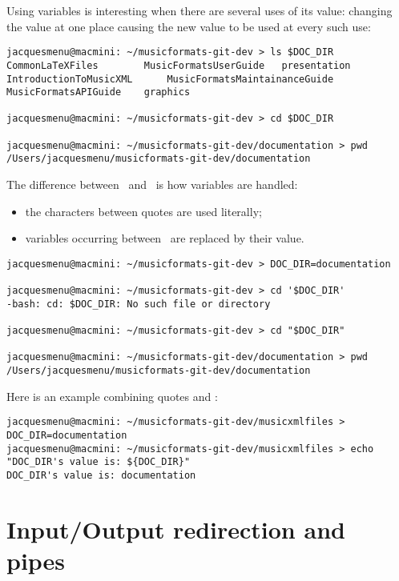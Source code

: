 Using variables is interesting when there are several uses of its value: changing the value at one place causing the new value to be used at every such use:
\begin{lstlisting}[language=Terminal]
jacquesmenu@macmini: ~/musicformats-git-dev > ls $DOC_DIR
CommonLaTeXFiles		MusicFormatsUserGuide	presentation
IntroductionToMusicXML		MusicFormatsMaintainanceGuide
MusicFormatsAPIGuide	graphics

jacquesmenu@macmini: ~/musicformats-git-dev > cd $DOC_DIR

jacquesmenu@macmini: ~/musicformats-git-dev/documentation > pwd
/Users/jacquesmenu/musicformats-git-dev/documentation
\end{lstlisting}

The difference between \quotes\ and \doubleQuotes\ is how variables are handled:
\begin{itemize}
\item the characters between quotes are used literally;
\item variables occurring between \doubleQuotes\ are replaced by their value.
\end{itemize}

\begin{lstlisting}[language=Terminal]
jacquesmenu@macmini: ~/musicformats-git-dev > DOC_DIR=documentation

jacquesmenu@macmini: ~/musicformats-git-dev > cd '$DOC_DIR'
-bash: cd: $DOC_DIR: No such file or directory

jacquesmenu@macmini: ~/musicformats-git-dev > cd "$DOC_DIR"

jacquesmenu@macmini: ~/musicformats-git-dev/documentation > pwd
/Users/jacquesmenu/musicformats-git-dev/documentation
\end{lstlisting}

Here is an example combining quotes and \doubleQuotes:
\begin{lstlisting}[language=Terminal]
jacquesmenu@macmini: ~/musicformats-git-dev/musicxmlfiles > DOC_DIR=documentation
jacquesmenu@macmini: ~/musicformats-git-dev/musicxmlfiles > echo "DOC_DIR's value is: ${DOC_DIR}"
DOC_DIR's value is: documentation
\end{lstlisting}


\section{Input/Output redirection and pipes}

